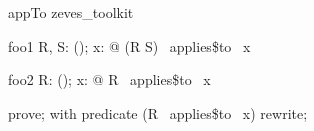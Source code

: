 
\begin{zsection}
 \SECTION appTo \parents zeves\_toolkit
\end{zsection}

\begin{theorem}{foo1}
   \forall R, S: \power(\nat \cross \nat); x: \nat @ (R \cup S) ~applies\$to~ x
\end{theorem}

\begin{theorem}{foo2}
   \forall R: \power(\nat \cross \nat); x: \nat @ R ~applies\$to~ x
\end{theorem}

\begin{zproof}[foo2]
   prove;
   with predicate (R~ applies\$to~ x) rewrite;
\end{zproof}